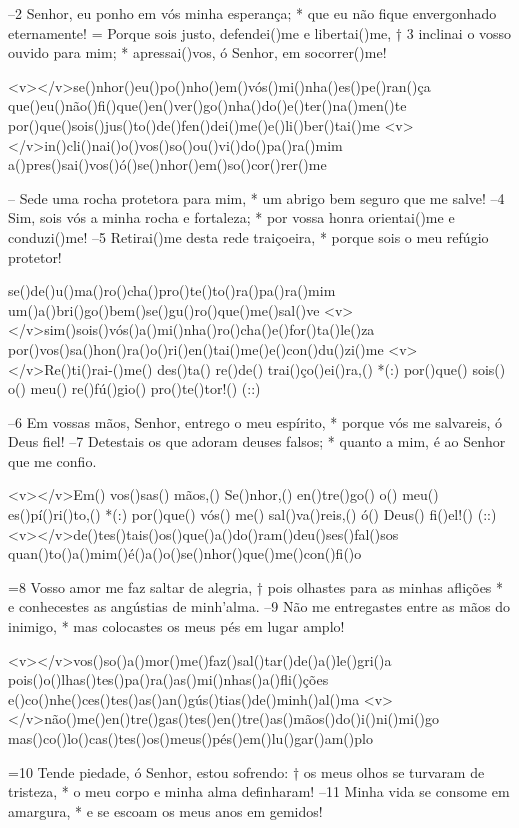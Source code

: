 –2 Senhor, eu ponho em vós minha esperança; *
que eu não fique envergonhado eternamente!
= Porque sois justo, defendei()me e libertai()me, †
3 inclinai o vosso ouvido para mim; *
apressai()vos, ó Senhor, em socorrer()me!

<v></v>se()nhor()eu()po()nho()em()vós()mi()nha()es()pe()ran()ça
que()eu()não()fi()que()en()ver()go()nha()do()e()ter()na()men()te
por()que()sois()jus()to()de()fen()dei()me()e()li()ber()tai()me
<v></v>in()cli()nai()o()vos()so()ou()vi()do()pa()ra()mim
a()pres()sai()vos()ó()se()nhor()em()so()cor()rer()me

– Sede uma rocha protetora para mim, *
um abrigo bem seguro que me salve!
–4 Sim, sois vós a minha rocha e fortaleza; *
por vossa honra orientai()me e conduzi()me!
–5 Retirai()me desta rede traiçoeira, *
porque sois o meu refúgio protetor!

se()de()u()ma()ro()cha()pro()te()to()ra()pa()ra()mim
um()a()bri()go()bem()se()gu()ro()que()me()sal()ve
<v></v>sim()sois()vós()a()mi()nha()ro()cha()e()for()ta()le()za
por()vos()sa()hon()ra()o()ri()en()tai()me()e()con()du()zi()me
<v></v>Re()ti()rai-()me() des()ta() re()de() trai()ço()ei()ra,() *(:)
por()que() sois() o() meu() re()fú()gio() pro()te()tor!() (::)

–6 Em vossas mãos, Senhor, entrego o meu espírito, *
porque vós me salvareis, ó Deus fiel!
–7 Detestais os que adoram deuses falsos; *
quanto a mim, é ao Senhor que me confio.

<v></v>Em() vos()sas() mãos,() Se()nhor,() en()tre()go() o() meu() es()pí()ri()to,() *(:)
por()que() vós() me() sal()va()reis,() ó() Deus() fi()el!() (::)
<v></v>de()tes()tais()os()que()a()do()ram()deu()ses()fal()sos
quan()to()a()mim()é()a()o()se()nhor()que()me()con()fi()o

=8 Vosso amor me faz saltar de alegria, †
pois olhastes para as minhas aflições *
e conhecestes as angústias de minh’alma.
–9 Não me entregastes entre as mãos do inimigo, *
mas colocastes os meus pés em lugar amplo!

<v></v>vos()so()a()mor()me()faz()sal()tar()de()a()le()gri()a
pois()o()lhas()tes()pa()ra()as()mi()nhas()a()fli()ções
e()co()nhe()ces()tes()as()an()gús()tias()de()minh()al()ma
<v></v>não()me()en()tre()gas()tes()en()tre()as()mãos()do()i()ni()mi()go
mas()co()lo()cas()tes()os()meus()pés()em()lu()gar()am()plo

=10 Tende piedade, ó Senhor, estou sofrendo: †
os meus olhos se turvaram de tristeza, *
o meu corpo e minha alma definharam!
–11 Minha vida se consome em amargura, *
e se escoam os meus anos em gemidos!

